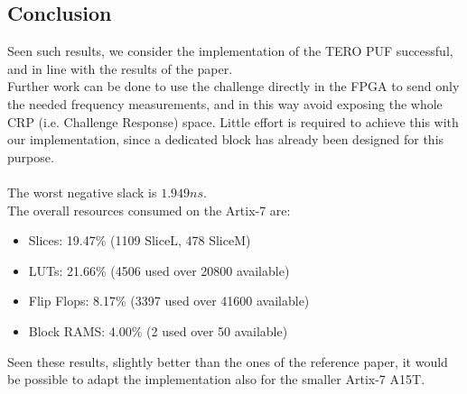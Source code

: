 \subsection{Conclusion}
Seen such results, we consider the implementation of the TERO PUF successful, and in line with the results of the paper. \\
Further work can be done to use the challenge directly in the FPGA to send only the needed frequency measurements, and in this way avoid
exposing the whole CRP (i.e. Challenge Response) space. Little effort is required to achieve this with our implementation, since a dedicated block has already been
designed for this purpose. \\\\
The worst negative slack is $1.949ns$. \\
The overall resources consumed on the Artix-7 are:
\begin{itemize}
    \item Slices: 19.47\% (1109 SliceL, 478 SliceM)
    \item LUTs: 21.66\% (4506 used over 20800 available)
    \item Flip Flops: 8.17\% (3397 used over 41600 available)
    \item Block RAMS: 4.00\% (2 used over 50 available)
\end{itemize}
Seen these results, slightly better than the ones of the reference paper,
it would be possible to adapt the implementation also for the smaller Artix-7 A15T.
